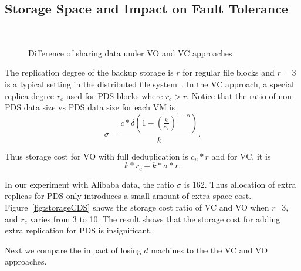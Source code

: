 \subsection{Storage Space and Impact on Fault Tolerance}
 
\begin{figure}
    \centering
    \\
    \caption{Difference of sharing data under VO and VC approaches}
    \label{fig:share}
\end{figure}

The replication degree of the backup storage 
is $r$ for regular file blocks and $r=3$ is a typical setting in the distributed
file system~\cite{Hadoop,GFS}.
In the VC approach, a special replica degree $r_c$ used for PDS blocks where $r_c>r$. 
Notice that the ratio of non-PDS data size vs PDS data size for each VM is
\[
\sigma=  \frac{c*\delta(1 -   (\frac{k}{c_u})^{1-\alpha})} {k}.
\]

Thus  storage cost for VO with full deduplication is $c_u *r$ and for VC, it is
\[ k*r_c  + k*\sigma *r.
\]

In our experiment with Alibaba data, the ratio $\sigma$ 
is 162. Thus allocation of extra replicas for PDS only introduces a small amount of extra space
cost.  Figure~\ref{fig:storageCDS} shows the storage cost ratio of VC and VO when 
$r$=3, and $r_c$ varies from 3 to 10.
The result shows that the storage cost for adding extra replication for PDS
is insignificant.


Next we  compare the impact of losing $d$ machines 
to the the VC and VO approaches.  



